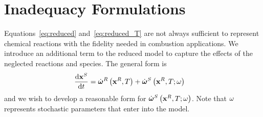 \section{Inadequacy Formulations}
Equations~\eqref{eq:reduced} and~\eqref{eq:reduced_T} are not always sufficient to represent 
chemical reactions with the fidelity needed in combustion applications.  We introduce an 
additional term to the reduced model to capture the effects of the neglected reactions and 
species.  The general form is 
\begin{align}
  \frac{\mathrm{d} \mathbf{x}^{S}}{\mathrm{d} t} &= \dot{\boldsymbol{\omega}}^{R}\left(\mathbf{x}^{R}, T\right) + \dot{\boldsymbol{\omega}}^{S}\left(\mathbf{x}^{R}, T; \omega\right)
\end{align}
and we wish to develop a reasonable form for $\dot{\boldsymbol{\omega}}^{S}\left(\mathbf{x}^{R}, T; \omega\right)$.  Note that $\omega$ 
represents stochastic parameters that enter into the model.






